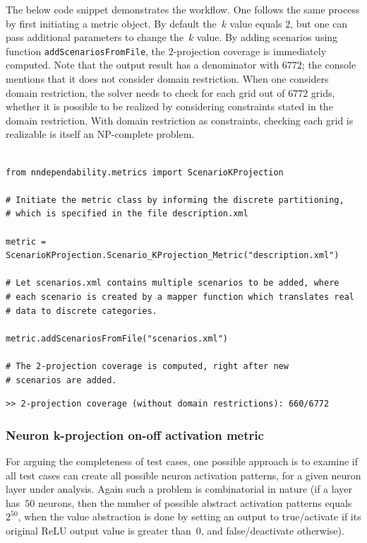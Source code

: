 \documentclass{article}
\begin{document}
 The below code snippet demonstrates the workflow. One follows the same process by first initiating a metric object. By default the~$k$ value equals $2$, but one can pass additional parameters to change the~$k$ value. By adding scenarios using function \texttt{addScenariosFromFile}, the 2-projection coverage is immediately computed. Note that the output result has a denominator with $6772$; the console mentions that it does not consider domain restriction. When one considers domain restriction, the solver needs to check for each grid out of $6772$ grids, whether it is possible to be realized by considering constraints stated in the domain restriction. With domain restriction as constraints, checking each grid is realizable is itself an NP-complete problem. 


\begin{small}
\color{blue}
\begin{verbatim}

from nndependability.metrics import ScenarioKProjection

# Initiate the metric class by informing the discrete partitioning, 
# which is specified in the file description.xml

metric = ScenarioKProjection.Scenario_KProjection_Metric("description.xml")

# Let scenarios.xml contains multiple scenarios to be added, where 
# each scenario is created by a mapper function which translates real 
# data to discrete categories.

metric.addScenariosFromFile("scenarios.xml")

# The 2-projection coverage is computed, right after new
# scenarios are added.
\end{verbatim}
\end{small}

\begin{small}
\color{red}
\begin{verbatim}
>> 2-projection coverage (without domain restrictions): 660/6772
\end{verbatim}
\end{small}

\subsubsection{Neuron k-projection on-off activation metric}\label{sub.sec.neuron.k.projection.metric}

For arguing the completeness of test cases, one possible approach is to examine if all test cases can create all possible neuron activation patterns, for a given neuron layer under analysis. Again such a problem is combinatorial in nature (if a layer has~$50$ neurons, then the number of possible abstract activation patterns equals $2^{50}$, when the value abstraction is done by setting an output to \textsf{true/activate} if its original ReLU output value is greater than~$0$, and  \textsf{false/deactivate} otherwise). 
\end{document}
